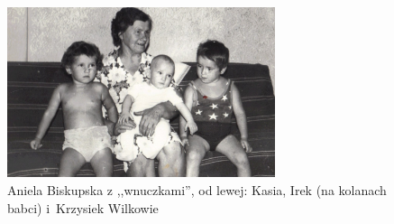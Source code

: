 \begin{figure}[!h]
\begin{center}
\includegraphics[width=0.7\textwidth]{zdjecia/aniela_biskupska_z_wnuczkami.jpg}
\caption[Aniela Biskupska z wnuczkami]{Aniela Biskupska z ,,wnuczkami'', od lewej: Kasia, Irek (na kolanach babci) i~Krzysiek Wilkowie}
\label{rys:aniela_biskupska_z_wnuczkami}
\end{center}
\end{figure}



